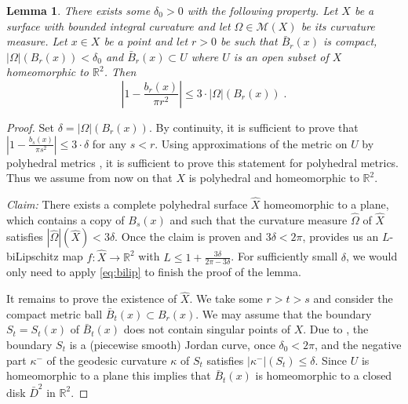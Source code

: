 \documentclass[12pt,leqno,intlimits]{amsart}
\numberwithin{equation}{section}
\newtheorem{lem}[thm]{Lemma}
\theoremstyle{definition}
\theoremstyle{remark}
\newcommand{\R}{\mathbb{R}}
\def\:{\colon}
\begin{document}
\begin{lem} \label{lem:bl}
There exists some $\delta _0>0$ with the following property.
Let $X$ be a surface with bounded integral curvature and let  $\Omega\in \mathcal M(X)$ be its   curvature measure. Let $x\in X$ be a point and let $r>0$ be such that
$\bar B_{r} (x)$ is compact,  $| \Omega| ( B_{r} (x) )  < \delta _0$ and $\bar B_{r} (x)\subset U$ where $U$ is an open subset of $X$ homeomorphic to $\R^2$.
Then $$|1- \frac {b_r(x)}  {\pi r^2} | \leq 3 \cdot |\Omega |( B_{r} (x)) \; .$$
\end{lem}


\begin{proof}
Set $\delta = |\Omega |( B_{r} (x))$. By continuity, it is sufficient to prove that $|1- \frac {b_s(x)}  {\pi s^2}| \leq 3 \cdot \delta $ for any $s<r$.  Using approximations of
the metric on $U$ by polyhedral metrics \cite[Theorem 8.4.3, Theorem 8.1.9]{Reshetnyak-GeomIV},  it is sufficient to prove this  statement for polyhedral metrics. Thus we assume from now on that $X$ is polyhedral  and homeomorphic to $\R^2$.

\emph{Claim:} There exists a complete polyhedral surface $\hat X$ homeomorphic to a plane,  which contains a copy of $B_s (x)$ and such that
the curvature measure $\hat \Omega$ of $\hat X$  satisfies $|\hat \Omega | (\hat X) < 3\delta$.  Once the claim is proven  and $3\delta < 2\pi$,
\cite{Bonk-Lang} provides us an $L$-biLipschitz map $f\:\hat X\to \R^2$ with $L\leq 1+\frac {3\delta} {2\pi -3\delta}$.
For sufficiently small $\delta$, we would only need to apply \eqref{eq:bilip} to finish the proof of the lemma.

It remains to prove the existence of $\hat X$. We take some $r>t>s$ and consider the compact  metric ball $\bar B_t (x) \subset B_r (x)$. We may assume that  the boundary $S_t=S_t (x)$ of
$\bar B_t (x)$ does not contain singular points of $X$. Due to \cite[Theorem 9.1, Theorem 9.3] {Reshetnyak-GeomIV}, the boundary $S_t$ is a (piecewise smooth) Jordan curve, once $\delta _0< 2\pi$, and the negative part $\kappa ^-$ of the geodesic curvature $\kappa$ of $S_t$  satisfies $|\kappa ^-| (S_t)  \leq \delta$.  Since $U$ is homeomorphic to a plane this implies that $\bar B_t (x)$ is homeomorphic to a closed disk $\bar D^2$ in $\R^2$.



\end{proof}
\end{document}

